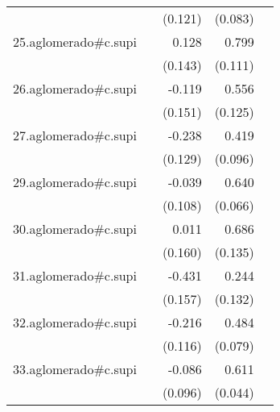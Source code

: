 {\begin{longtable}{l*{4}{D{.}{.}{-1}}}
            &                     &     (0.121)         &     (0.083)         &                     \\
\addlinespace
25.aglomerado#c.supi&                     &       0.128         &       0.799\sym{***}&                     \\
            &                     &     (0.143)         &     (0.111)         &                     \\
\addlinespace
26.aglomerado#c.supi&                     &      -0.119         &       0.556\sym{***}&                     \\
            &                     &     (0.151)         &     (0.125)         &                     \\
\addlinespace
27.aglomerado#c.supi&                     &      -0.238         &       0.419\sym{***}&                     \\
            &                     &     (0.129)         &     (0.096)         &                     \\
\addlinespace
29.aglomerado#c.supi&                     &      -0.039         &       0.640\sym{***}&                     \\
            &                     &     (0.108)         &     (0.066)         &                     \\
\addlinespace
30.aglomerado#c.supi&                     &       0.011         &       0.686\sym{***}&                     \\
            &                     &     (0.160)         &     (0.135)         &                     \\
\addlinespace
31.aglomerado#c.supi&                     &      -0.431\sym{**} &       0.244         &                     \\
            &                     &     (0.157)         &     (0.132)         &                     \\
\addlinespace
32.aglomerado#c.supi&                     &      -0.216         &       0.484\sym{***}&                     \\
            &                     &     (0.116)         &     (0.079)         &                     \\
\addlinespace
33.aglomerado#c.supi&                     &      -0.086         &       0.611\sym{***}&                     \\
            &                     &     (0.096)         &     (0.044)         &                     \\

\end{longtable}}
